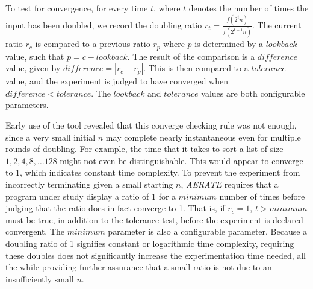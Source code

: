 \documentclass[10pt,twocolumn]{article}
\begin{document}
  To test for convergence, for every time $t$, where $t$ denotes the number of times the input has been doubled, we
  record the doubling ratio $r_t = \frac{f(2^t n)}{f(2^{t-1}n)}$. The current ratio $r_c$ is compared to a previous
  ratio $r_p$ where $p$ is determined by a $\mathit{lookback}$ value, such that $p=c-\mathit{lookback}$.  The result of
  the comparison is a $\mathit{difference}$ value, given by $\mathit{difference} = |r_c - r_p|$.  This is then compared
  to a $\mathit{tolerance}$ value, and the experiment is judged to have converged when $\mathit{difference}<\mathit{tolerance}$.
  The $\mathit{lookback}$ and $\mathit{tolerance}$ values are both configurable parameters.

  Early use of the tool revealed that this converge checking rule was
  not enough, since a very small initial $n$ may complete nearly
  instantaneous even for multiple rounds of doubling.  For example, the
  time that it takes to sort a list of size $1, 2, 4, 8, \dots 128$
  might not even be distinguishable. This would appear to converge to 1, which 
  indicates constant time complexity. To prevent the experiment from incorrectly terminating
  given a small starting $n$, \textit{AERATE} requires that a program under study display a ratio of 1 for a
  $\mathit{minimum}$ number of times before judging that the ratio does in fact converge to 1.  That is, if $r_c = 1$,
  $t > \mathit{minimum}$ must be true, in addition to the tolerance test, before the experiment is declared convergent.
  The $\mathit{minimum}$ parameter is also a configurable parameter.  Because a doubling ratio of 1 signifies
  constant or logarithmic time complexity, requiring these doubles does not significantly increase the experimentation
  time needed, all the while providing further assurance that a small ratio is not due to an insufficiently small $n$.

\end{document}

